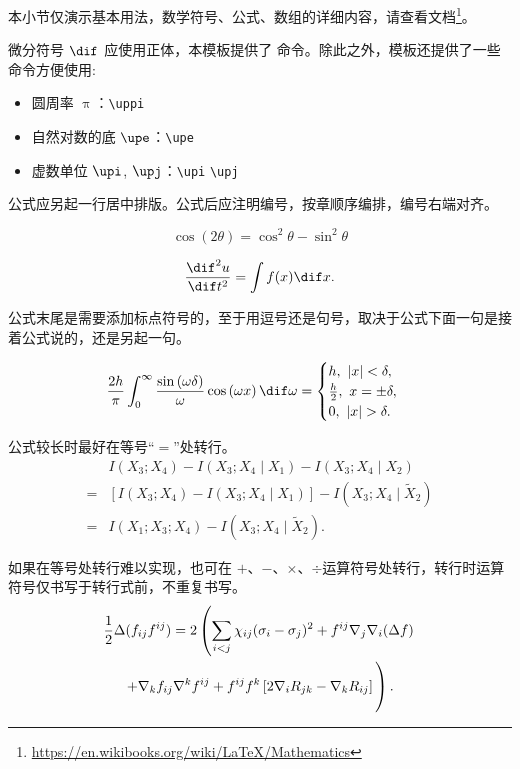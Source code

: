本小节仅演示基本用法，数学符号、公式、数组的详细内容，请查看文档\footnote{\url{https://en.wikibooks.org/wiki/LaTeX/Mathematics}}。

微分符号 $\dif$ 应使用正体，本模板提供了  命令。除此之外，模板还提供了一些命令方便使用:
\begin{itemize}
  \item 圆周率 $\uppi$：\verb|\uppi|
  \item 自然对数的底 $\upe$：\verb|\upe|
  \item 虚数单位 $\upi$, $\upj$：\verb|\upi| \verb|\upj|
\end{itemize}

公式应另起一行居中排版。公式后应注明编号，按章顺序编排，编号右端对齐。

\begin{equation}
	\cos (2\theta) = \cos^2 \theta - \sin^2 \theta
\end{equation}

\begin{equation}
  \frac{\dif^2 u}{\dif t^2} = \int f(x) \dif x.
\end{equation}

公式末尾是需要添加标点符号的，至于用逗号还是句号，取决于公式下面一句是接着公式说的，还是另起一句。

\begin{equation}
	\frac{2h}{\pi}\int_{0}^{\infty}\frac{\sin\left( \omega\delta \right)}{\omega}
	\cos\left( \omega x \right) \dif\omega = 
	\begin{cases}
		h, \ \left| x \right| < \delta, \\
		\frac{h}{2}, \ x = \pm \delta, \\
		0, \ \left| x \right| > \delta.
	\end{cases}
\end{equation}

公式较长时最好在等号“$=$”处转行。
\begin{align}
    & I (X_3; X_4) - I (X_3; X_4 \mid X_1) - I (X_3; X_4 \mid X_2) \nonumber \\
  = & [I (X_3; X_4) - I (X_3; X_4 \mid X_1)] - I (X_3; X_4 \mid \tilde{X}_2) \\
  = & I (X_1; X_3; X_4) - I (X_3; X_4 \mid \tilde{X}_2).
\end{align}

如果在等号处转行难以实现，也可在 $+$、$-$、$\times$、$\div$运算符号处转行，转行时运算符号仅书写于转行式前，不重复书写。
\begin{multline}
  \frac{1}{2} \Delta (f_{ij} f^{ij}) =
    2 \left(\sum_{i<j} \chi_{ij}(\sigma_{i} - \sigma_{j})^{2}
    + f^{ij} \nabla_{j} \nabla_{i} (\Delta f) \right. \\
  \left. + \nabla_{k} f_{ij} \nabla^{k} f^{ij} +
    f^{ij} f^{k} \left[2\nabla_{i}R_{jk}
    - \nabla_{k} R_{ij} \right] \vphantom{\sum_{i<j}} \right).
\end{multline}


